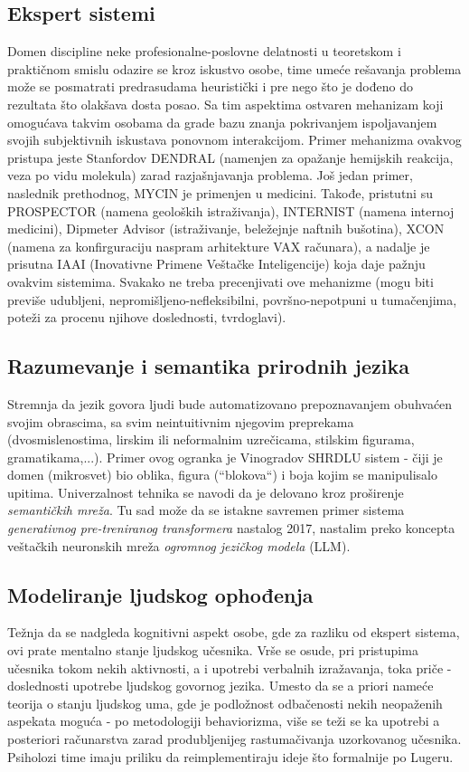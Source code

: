 \documentclass[fontsize=11bp, paper=a4]{scrartcl}
\begin{document}
\subsection{\normalsize{Ekspert sistemi}}
Domen discipline neke profesionalne-poslovne delatnosti u teoretskom i praktičnom smislu odazire se kroz iskustvo osobe, time umeće rešavanja problema može se posmatrati predrasudama heuristički i pre nego što je dođeno do rezultata što olakšava dosta posao. 
Sa tim aspektima ostvaren mehanizam koji omogućava takvim osobama da grade bazu znanja pokrivanjem ispoljavanjem svojih subjektivnih iskustava ponovnom interakcijom.
Primer mehanizma ovakvog pristupa jeste Stanfordov DENDRAL (namenjen za opažanje hemijskih reakcija, veza po vidu molekula) zarad razjašnjavanja problema. Još jedan primer, naslednik prethodnog, MYCIN je primenjen u medicini. Takođe, pristutni su PROSPECTOR (namena geoloških istraživanja), INTERNIST (namena internoj medicini), Dipmeter Advisor (istraživanje, beležejnje naftnih bušotina), XCON (namena za konfirguraciju naspram arhitekture VAX računara), a nadalje je prisutna IAAI (Inovativne Primene Veštačke Inteligencije) koja daje pažnju ovakvim sistemima. Svakako ne treba precenjivati ove mehanizme (mogu biti previše udubljeni, nepromišljeno-nefleksibilni, površno-nepotpuni u tumačenjima, poteži za procenu njihove doslednosti, tvrdoglavi).

\subsection{\normalsize{Razumevanje i semantika prirodnih jezika}}
Stremnja da jezik govora ljudi bude automatizovano prepoznavanjem obuhvaćen svojim obrascima, sa svim neintuitivnim njegovim preprekama (dvosmislenostima, lirskim ili neformalnim uzrečicama, stilskim figurama, gramatikama,...). Primer ovog ogranka je Vinogradov SHRDLU sistem - čiji je domen (mikrosvet) bio oblika, figura (``blokova``) i boja kojim se manipulisalo upitima. Univerzalnost tehnika se navodi da je delovano kroz proširenje \textit{semantičkih mreža}.
Tu sad može da se istakne savremen primer sistema \textit{generativnog pre-treniranog transformera} nastalog 2017, nastalim preko koncepta veštačkih neuronskih mreža \textit{ogromnog jezičkog modela} (LLM).\cite{gpt}

\subsection{\normalsize{Modeliranje ljudskog ophođenja}}
Težnja da se nadgleda kognitivni aspekt osobe, gde za razliku od ekspert sistema, ovi prate mentalno stanje ljudskog učesnika. Vrše se osude, pri pristupima učesnika tokom nekih aktivnosti, a i upotrebi verbalnih izražavanja, toka priče - doslednosti upotrebe ljudskog govornog jezika. Umesto da se a priori nameće teorija o stanju ljudskog uma, gde je podložnost odbačenosti nekih neopaženih aspekata moguća - po metodologiji behaviorizma, više se teži se ka upotrebi a posteriori računarstva zarad produbljenijeg rastumačivanja uzorkovanog učesnika. Psiholozi time imaju priliku da reimplementiraju ideje što formalnije po Lugeru.
\end{document}
